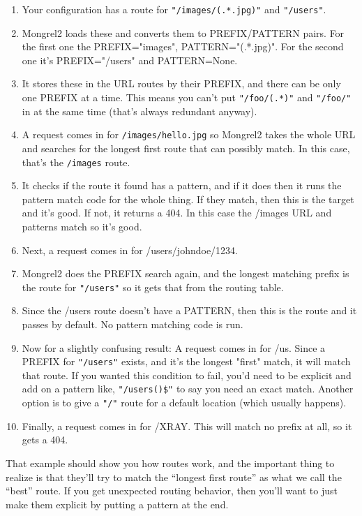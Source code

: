 \begin{enumerate}
\item Your configuration has a route for \verb|"/images/(.*.jpg)"| and \verb|"/users"|.
\item Mongrel2 loads these and converts them to PREFIX/PATTERN pairs.  For the first one
    the PREFIX="images", PATTERN="(.*.jpg)".  For the second one it's PREFIX="/users" and
    PATTERN=None.
\item It stores these in the URL routes by their PREFIX, and there can be only one
    PREFIX at a time.  This means you can't put \verb|"/foo/(.*)"| and \verb|"/foo/"|
    in at the same time (that's always redundant anyway).
\item A request comes in for \verb|/images/hello.jpg| so Mongrel2 takes the whole URL
    and searches for the longest first route that can possibly match.  In this case, that's
    the \verb|/images| route.
\item It checks if the route it found has a pattern, and if it does then it runs the
    pattern match code for the whole thing.  If they match, then this is the target
    and it's good.  If not, it returns a 404.  In this case the /images URL and patterns
    match so it's good.
\item Next, a request comes in for /users/johndoe/1234.
\item Mongrel2 does the PREFIX search again, and the longest matching prefix is the
    route for \verb|"/users"| so it gets that from the routing table.
\item Since the /users route doesn't have a PATTERN, then this is the route and it passes
    by default. No pattern matching code is run.
\item Now for a slightly confusing result:  A request comes in for /us.  Since a PREFIX
    for \verb|"/users"| exists, and it's the longest "first" match, it will match that
    route.  If you wanted this condition to fail, you'd need to be explicit and add on a
    pattern like, \verb|"/users()$"| to say you need an exact match. Another option is
    to give a \verb|"/"| route for a default location (which usually happens).
\item Finally, a request comes in for /XRAY\@.  This will match no prefix at all, so it
    gets a 404.
\end{enumerate}

That example should show you how routes work, and the important thing to realize
is that they'll try to match the ``longest first route'' as what we call the ``best''
route.  If you get unexpected routing behavior, then you'll want to just make them
explicit by putting a pattern at the end.

